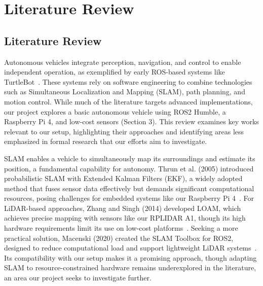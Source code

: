 \documentclass[english,project]{buwthesis}
\begin{document}
\chapter{Literature Review}


\section{Literature Review} \label{sec:literature_review}

Autonomous vehicles integrate perception, navigation, and control to enable independent operation, as exemplified by early ROS-based systems like TurtleBot~\cite{quigley2009ros}. These systems rely on software engineering to combine technologies such as Simultaneous Localization and Mapping (SLAM), path planning, and motion control. While much of the literature targets advanced implementations, our project explores a basic autonomous vehicle using ROS2 Humble, a Raspberry Pi 4, and low-cost sensors (Section 3). This review examines key works relevant to our setup, highlighting their approaches and identifying areas less emphasized in formal research that our efforts aim to investigate.

SLAM enables a vehicle to simultaneously map its surroundings and estimate its position, a fundamental capability for autonomy. Thrun et al. (2005) introduced probabilistic SLAM with Extended Kalman Filters (EKF), a widely adopted method that fuses sensor data effectively but demands significant computational resources, posing challenges for embedded systems like our Raspberry Pi 4~\cite{thrun2005probabilistic}. For LiDAR-based approaches, Zhang and Singh (2014) developed LOAM, which achieves precise mapping with sensors like our RPLIDAR A1, though its high hardware requirements limit its use on low-cost platforms~\cite{zhang2014loam}. Seeking a more practical solution, Macenski (2020) created the SLAM Toolbox for ROS2, designed to reduce computational load and support lightweight LiDAR systems~\cite{macenski2020slamtoolbox}. Its compatibility with our setup makes it a promising approach, though adapting SLAM to resource-constrained hardware remains underexplored in the literature, an area our project seeks to investigate further.
\end{document}
